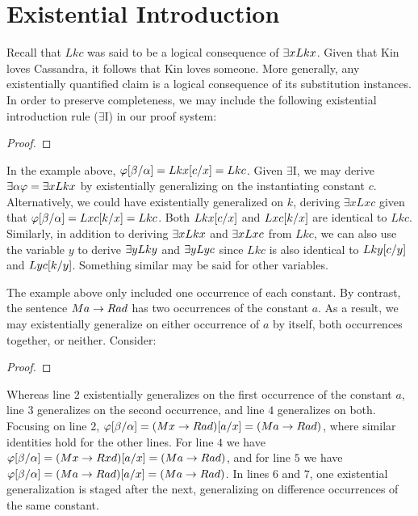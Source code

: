 \section{Existential Introduction}
  \label{sec:ExistIntro}

Recall that $Lkc$ was said to be a logical consequence of $\exists x Lkx$.
Given that Kin loves Cassandra, it follows that Kin loves someone.
More generally, any existentially quantified claim is a logical consequence of its substitution instances.
In order to preserve completeness, we may include the following existential introduction rule ($\exists$I) in our proof system:

\begin{proof}
     
	   
\end{proof}

In the example above, $\varphi[\beta/\alpha]=Lkx[c/x]=Lkc$.
Given $\exists$I, we may derive $\exists \alpha\varphi=\exists xLkx$ by existentially generalizing on the instantiating constant $c$.
Alternatively, we could have existentially generalized on $k$, deriving $\exists xLxc$ given that $\varphi[\beta/\alpha]=Lxc[k/x]=Lkc$. 
Both $Lkx[c/x]$ and $Lxc[k/x]$ are identical to $Lkc$. 
Similarly, in addition to deriving $\exists xLkx$ and $\exists xLxc$ from $Lkc$, we can also use the variable $y$ to derive $\exists yLky$ and $\exists yLyc$ since $Lkc$ is also identical to $Lky[c/y]$ and $Lyc[k/y]$.
Something similar may be said for other variables.

The example above only included one occurrence of each constant.
By contrast, the sentence $Ma \rightarrow Rad$ has two occurrences of the constant $a$.
As a result, we may existentially generalize on either occurrence of $a$ by itself, both occurrences together, or neither.
Consider:

\begin{proof}
	 \pr{}
	 
	 
	 
	 
	 
	 
\end{proof}

Whereas line $2$ existentially generalizes on the first occurrence of the constant $a$, line $3$ generalizes on the second occurrence, and line $4$ generalizes on both. 
Focusing on line $2$, $\varphi[\beta/\alpha]=(Mx \rightarrow Rad)[a/x]=(Ma \rightarrow Rad)$, where similar identities hold for the other lines.
For line $4$ we have $\varphi[\beta/\alpha]=(Mx \rightarrow Rxd)[a/x]=(Ma \rightarrow Rad)$, and for line $5$ we have $\varphi[\beta/\alpha]=(Ma \rightarrow Rad)[a/x]=(Ma \rightarrow Rad)$.
In lines $6$ and $7$, one existential generalization is staged after the next, generalizing on difference occurrences of the same constant. 

